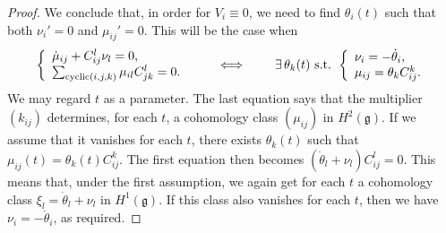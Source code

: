 \documentclass[11pt]{article}
\theoremstyle{plain}
\theoremstyle{definition}
\begin{document}
\begin{proof}
We conclude that, in order for $V_i \equiv 0$, we need to find $\theta_i(t)$ such that both $\nu_i'=0$ and $\mu_{ij}'=0$. This will be the case when
\begin{equation*} \label{timecoh} 
\left\{\begin{array}{l}{\dot\mu}_{ij}  + C^l_{ij}\nu_l = 0, \\ \sum_{{\rm{cyclic}}(i,j,k)} \mu_{il}C^l_{jk} = 0.\end{array} \right. \qquad \iff \qquad \mbox{$\exists\, \theta_k(t)$ s.t. } \left\{\begin{array}{l} \nu_i = - {\dot\theta}_i, \\ \mu_{ij}=\theta_ k C^k_{ij}. \end{array} \right.
\end{equation*}
We may regard $t$ as a parameter. The last equation says that the multiplier $(k_{ij})$ determines, for each $t$, a cohomology class $(\mu_{ij})$ in $H^2(\mathfrak{g})$. If we assume that it vanishes for each $t$, there exists $\theta_k(t)$ such that $\mu_{ij}(t) = \theta_k(t)C^k_{ij}$. The first equation then becomes $( {\dot\theta}_l +\nu_l )C^l_{ij} = 0$. This means that, under the first assumption,  we again get for each $t$ a cohomology class $\xi_l={\dot\theta}_l +\nu_l$ in $H^1(\mathfrak{g})$. If this class also vanishes for each $t$, then we have  $\nu_i = - {\dot\theta}_i$, as required.
\end{proof}
\end{document}
